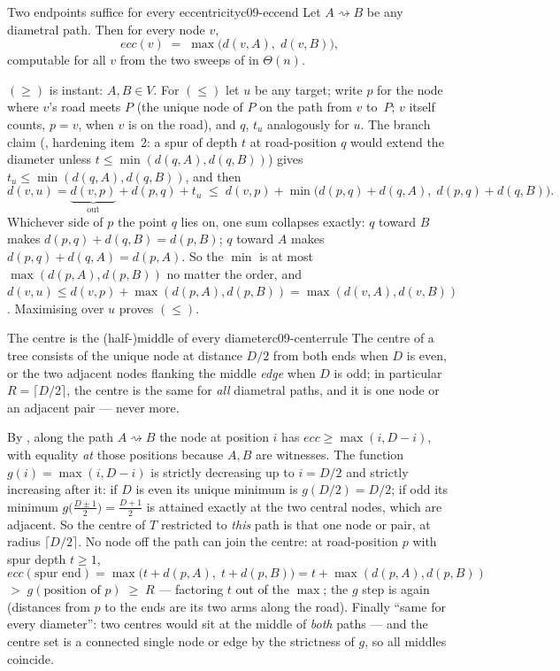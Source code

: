 \begin{theorem}{Two endpoints suffice for every eccentricity}{c09-eccend}
Let $A \rightsquigarrow B$ be any diametral path. Then for every node $v$,
\[
  \mathit{ecc}(v) \;=\; \max\big(d(v, A),\; d(v, B)\big),
\]
computable for all $v$ from the two sweeps of  in $\Theta(n)$.
\end{theorem}
\begin{proofbox}
$(\ge)$ is instant: $A,B \in V$. For $(\le)$ let $u$ be any target; write $p$ for the
node where $v$'s road meets $P$ (the unique node of $P$ on the path from $v$ to~$P$;
$v$ itself counts, $p = v$, when $v$ is on the road), and $q$, $t_u$ analogously for
$u$. The branch claim (, hardening item~2: a spur of depth $t$ at
road-position $q$ would extend the diameter unless $t \le \min(d(q,A), d(q,B))$) gives
$t_u \le \min(d(q,A), d(q,B))$, and then
\[
  d(v,u) = \underbrace{d(v,p)}_{\text{out}} + d(p,q) + t_u
  \;\le\; d(v,p) + \min\big(d(p,q){+}d(q,A),\; d(p,q){+}d(q,B)\big).
\]
Whichever side of $p$ the point $q$ lies on, one sum collapses exactly: $q$ toward $B$
makes $d(p,q){+}d(q,B) = d(p,B)$; $q$ toward $A$ makes $d(p,q){+}d(q,A) = d(p,A)$. So
the $\min$ is at most $\max(d(p,A), d(p,B))$ no matter the order, and
$d(v,u) \le d(v,p) + \max(d(p,A), d(p,B)) = \max(d(v,A), d(v,B))$. Maximising over $u$
proves $(\le)$.
\end{proofbox}

\begin{theorem}{The centre is the (half-)middle of every diameter}{c09-centerrule}
The centre of a tree consists of the unique node at distance $D/2$ from both ends when
$D$ is even, or the two adjacent nodes flanking the middle \emph{edge} when $D$ is
odd; in particular $R = \lceil D/2 \rceil$, the centre is the same for \emph{all}
diametral paths, and it is one node or an adjacent pair --- never more.
\end{theorem}
\begin{proofbox}
By , along the path $A \rightsquigarrow B$ the node at position $i$
has $\mathit{ecc} \ge \max(i, D-i)$, with equality \emph{at} those positions because
$A, B$ are witnesses. The function $g(i) = \max(i, D-i)$ is strictly decreasing up to
$i = D/2$ and strictly increasing after it: if $D$ is even its unique minimum is
$g(D/2) = D/2$; if odd its minimum $g\big(\tfrac{D \pm 1}{2}\big) = \tfrac{D+1}{2}$ is
attained exactly at the two central nodes, which are adjacent. So the centre of $T$
restricted to \emph{this} path is that one node or pair, at radius $\lceil D/2 \rceil$.
No node off the path can join the centre: at road-position $p$ with spur depth $t \ge 1$,
\[
  \mathit{ecc}(\text{spur end}) = \max\big(t + d(p,A),\; t + d(p,B)\big)
  = t + \max(d(p,A), d(p,B))
\]
\noindent
\hspace*{2em}$>\; g(\text{position of } p) \;\ge\; R$ --- factoring $t$ out of the
$\max$; the $g$ step is  again (distances from $p$ to the ends are
its two arms along the road). Finally ``same for every diameter'': two
centres would sit at the middle of \emph{both} paths --- and the centre set is a
connected single node or edge by the strictness of $g$, so all middles coincide.
\end{proofbox}


